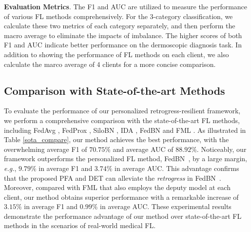 \documentclass[runningheads]{llncs}
\begin{document}
\noindent \textbf{Evaluation Metrics}.
The F1 and AUC are utilized to measure the performance of various FL methods comprehensively. For the 3-category classification, we calculate these two metrics of each category separately, and then perform the macro average to eliminate the impacts of imbalance. The higher scores of both F1 and AUC indicate better performance on the dermoscopic diagnosis task. In addition to showing the performance of FL methods on each client, we also calculate the marco average of 4 clients for a more concise comparison.
\subsection{Comparison with State-of-the-art Methods}
To evaluate the performance of our personalized retrogress-resilient framework, we perform a comprehensive comparison with the state-of-the-art FL methods, including FedAvg \cite{fedavg}, FedProx \cite{fedprox}, SiloBN \cite{andreux2020siloed}, IDA \cite{yeganeh2020inverse}, FedBN \cite{li2021fedbn} and FML \cite{federated_mutual}. As illustrated in Table \ref{sota_compare}, our method achieves the best performance, with the overwhelming average F1 of $70.75\%$ and average AUC of $88.92\%$. 
Noticeably, our framework outperforms the personalized FL method, FedBN~\cite{li2021fedbn}, by a large margin, \textit{e.g.}, $9.79\%$ in average F1 and $3.74\%$ in average AUC. This advantage confirms that the proposed PFA and DET can alleviate the \textit{retrogress} in FedBN~\cite{li2021fedbn}.
Moreover, compared with FML \cite{federated_mutual} that also employs the deputy model at each client, our method obtains superior performance with a remarkable increase of $3.15\%$ in average F1 and $0.99\%$ in average AUC. These experimental results demonstrate the performance advantage of our method over state-of-the-art FL methods in the scenarios of real-world medical FL. 
\end{document}

